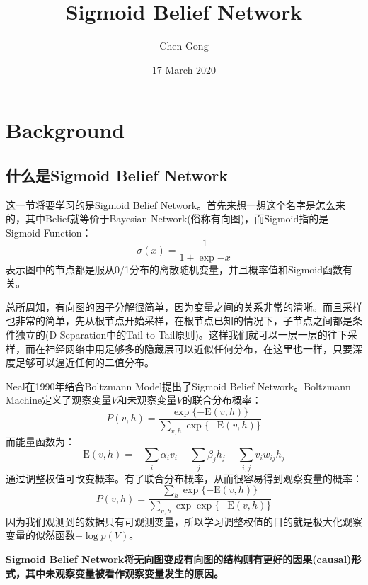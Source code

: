 \documentclass[a4paper]{article}
\title{Sigmoid Belief Network}
\author{Chen Gong}
\date{17 March 2020}
\begin{document}
\maketitle
\tableofcontents
\newpage
\setcounter{page}{1} %
\clearpage

\section{Background}
\subsection{什么是Sigmoid Belief Network}
这一节将要学习的是Sigmoid Belief Network。首先来想一想这个名字是怎么来的，其中Belief就等价于Bayesian Network(俗称有向图)，而Sigmoid指的是Sigmoid Function：
$$
\sigma(x) = \frac{1}{1+\exp{-x}}
$$
表示图中的节点都是服从0/1分布的离散随机变量，并且概率值和Sigmoid函数有关。

总所周知，有向图的因子分解很简单，因为变量之间的关系非常的清晰。而且采样也非常的简单，先从根节点开始采样，在根节点已知的情况下，子节点之间都是条件独立的(D-Separation中的Tail to Tail原则)。这样我们就可以一层一层的往下采样，而在神经网络中用足够多的隐藏层可以近似任何分布，在这里也一样，只要深度足够可以逼近任何的二值分布。

Neal在1990年结合Boltzmann Model提出了Sigmoid Belief Network。Boltzmann Machine定义了观察变量$V$和未观察变量$V$的联合分布概率：
\begin{equation}
    P(v,h) = \frac{\exp{\{-\mathrm{E}(v,h)}\}}{\sum_{v,h}\exp{\{-\mathrm{E}(v,h)}\}}
\end{equation}
而能量函数为：
\begin{equation}
    \mathrm{E}(v,h) = -\sum_i\alpha_iv_i - \sum_j\beta_jh_j - \sum_{i,j} v_i w_{ij} h_j
\end{equation}
通过调整权值可改变概率。有了联合分布概率，从而很容易得到观察变量的概率：
\begin{equation}
    P(v,h) = \frac{\sum_h\exp{\{-\mathrm{E}(v,h)}\}}{\sum_{v,h}\exp{\exp{\{-\mathrm{E}(v,h)}\}}}
\end{equation}
因为我们观测到的数据只有可观测变量，所以学习调整权值的目的就是极大化观察变量的似然函数$-\log p(V)$。

\textbf{Sigmoid Belief Network将无向图变成有向图的结构则有更好的因果(causal)形式，其中未观察变量被看作观察变量发生的原因。}
\end{document}
